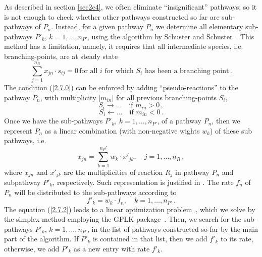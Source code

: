 As described in section \ref{sec2c4}, we often eliminate ``insignificant'' pathways; so it is not enough to check whether other pathways constructed so far are sub-pathways of $P_n$.  Instead, for a given pathway $P_n$ we determine all elementary sub-pathways $P'_k$, $k=1,\ldots,n_{P'}$, using the algorithm by Schuster and Schuster~\cite{Schuster1993refined, Lehmann2004/JAC}. This method has a limitation, namely, it requires that all intermediate species, i.e. branching-points, are at steady state
\begin{equation}
\sum_{j=1}^{n_R} x_{jn}\cdot s_{ij} = 0 \, \textrm{for all } i\textrm{ for which } S_i \textrm{ has been a branching point}\,.
\label{2.7.0}
\end{equation}
The condition (\ref{2.7.0}) can be enforced by adding ``pseudo-reactions'' to the pathway $P_n$, with multiplicity $|m_{in}|$ for all previous branching-points $S_i$,
\begin{equation}
S_i \rightarrow\ldots \quad \textrm{if } m_{in}>0 \,,
\label{2.7.1}
\end{equation}
\begin{equation}
S_i \leftarrow\ldots \quad \textrm{if } m_{in}<0\,.
\label{2.7.1.1}
\end{equation}
Once we have the sub-pathways $P'_k$, $k=1,\ldots,n_{P'}$, of a pathway $P_n$, then we represent $P_n$ as a linear combination (with non-negative wights $w_k$) of these sub pathways, i.e.
\begin{equation}
x_{jn}=\sum_{k=1}^{n_P'} w_k\cdot x'_{jk}, \quad j =1,\ldots, n_R\,,
\label{2.7.2}
\end{equation}
where $x_{jn}$ and $x'_{jk}$  are the multiplicities of reaction $R_j$ in pathway $P_n$ and subpathway $P'_k$, respectively. Such representation is justified in \cite{Schuster2002}. The rate $f_n$ of $P_n$ will be distributed to the sub-pathways according to 
\begin{equation}
f'_k = w_k \cdot f_n, \quad k=1,\ldots , n_{P'}\,.
\label{2.7.3}
\end{equation}
The equation (\ref{2.7.2}) leads to a linear optimization problem~\cite{Lehmann2004/JAC}, which we solve by the simplex method employing the GPLK package~\cite{Glpk}. Then, we search for the sub-pathways $P'_k$, $k=1,\ldots , n_{P'}$, in the list of pathways constructed so far by the main part of the algorithm. If $P'_k$ is contained in that list, then we add $f'_k$ to its rate, otherwise, we add $P'_k$ as a new entry with rate $f'_k$.




























